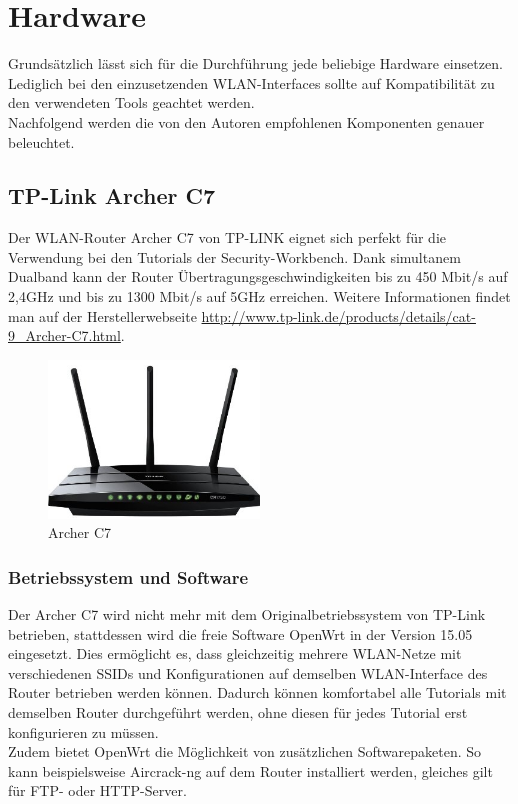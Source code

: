 \section{Hardware}
\label{sc:hw}
Grundsätzlich lässt sich für die Durchführung jede beliebige Hardware einsetzen. Lediglich bei den einzusetzenden WLAN-Interfaces sollte auf Kompatibilität zu den verwendeten Tools geachtet werden.\\
Nachfolgend werden die von den Autoren empfohlenen Komponenten genauer beleuchtet. 
 
\subsection{TP-Link Archer C7}
 Der WLAN-Router Archer C7 von TP-LINK eignet sich perfekt für die Verwendung bei den Tutorials der Security-Workbench. Dank simultanem Dualband kann der Router Übertragungsgeschwindigkeiten bis zu 450 Mbit/s auf 2,4GHz und bis zu 1300 Mbit/s auf 5GHz erreichen. Weitere Informationen findet man auf der Herstellerwebseite \url{http://www.tp-link.de/products/details/cat-9_Archer-C7.html}.
 
\begin{figure}[H]
	\centering
	\includegraphics[width=0.5\textwidth]{images/WLAN/ArcherC7.jpg}
	\caption{Archer C7}
	\label{fig:Archer C7}
\end{figure}

\subsubsection{Betriebssystem und Software}
Der Archer C7 wird nicht mehr mit dem Originalbetriebssystem von TP-Link betrieben, stattdessen wird die freie Software OpenWrt in der Version 15.05 eingesetzt. Dies ermöglicht es, dass gleichzeitig mehrere WLAN-Netze mit verschiedenen SSIDs und Konfigurationen auf demselben WLAN-Interface des Router betrieben werden können. Dadurch können komfortabel alle Tutorials mit demselben Router durchgeführt werden, ohne diesen für jedes Tutorial erst konfigurieren zu müssen.\\
Zudem bietet OpenWrt die Möglichkeit von zusätzlichen Softwarepaketen. So kann beispielsweise Aircrack-ng auf dem Router installiert werden, gleiches gilt für FTP- oder HTTP-Server.

